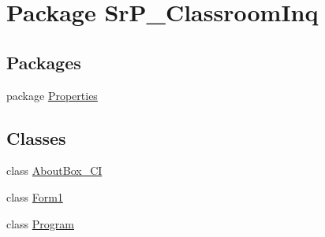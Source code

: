 \hypertarget{namespace_sr_p___classroom_inq}{
\section{\-Package \-Sr\-P\-\_\-\-Classroom\-Inq}
\label{namespace_sr_p___classroom_inq}
}
\subsection*{\-Packages}
\begin{DoxyCompactItemize}
\item 
package \hyperlink{namespace_sr_p___classroom_inq_1_1_properties}{\-Properties}
\end{DoxyCompactItemize}
\subsection*{\-Classes}
\begin{DoxyCompactItemize}
\item 
class \hyperlink{class_sr_p___classroom_inq_1_1_about_box___c_i}{\-About\-Box\-\_\-\-C\-I}
\item 
class \hyperlink{class_sr_p___classroom_inq_1_1_form1}{\-Form1}
\item 
class \hyperlink{class_sr_p___classroom_inq_1_1_program}{\-Program}
\end{DoxyCompactItemize}
